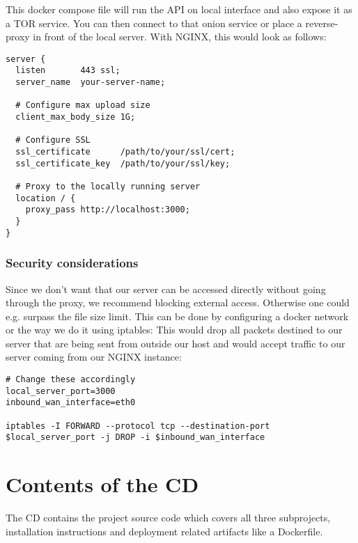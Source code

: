 This docker compose file will run the API on local interface and also expose it as a TOR service. You can then connect to that onion service or place a reverse-proxy in front of the local server. With NGINX, this would look as follows:

\begin{lstlisting}
server {
  listen       443 ssl;
  server_name  your-server-name;

  # Configure max upload size
  client_max_body_size 1G;

  # Configure SSL
  ssl_certificate      /path/to/your/ssl/cert;
  ssl_certificate_key  /path/to/your/ssl/key;
  
  # Proxy to the locally running server
  location / {
    proxy_pass http://localhost:3000;
  }
}
\end{lstlisting}
\subsection{Security considerations}

Since we don't want that our server can be accessed directly without going through the proxy, we recommend blocking external access. Otherwise one could e.g. surpass the file size limit.
This can be done by configuring a docker network or the way we do it using iptables:
This would drop all packets destined to our server that are being sent from outside our host and would accept traffic to our server coming from our NGINX instance:

\begin{lstlisting}
# Change these accordingly
local_server_port=3000
inbound_wan_interface=eth0

iptables -I FORWARD --protocol tcp --destination-port $local_server_port -j DROP -i $inbound_wan_interface
\end{lstlisting}


\chapter{Contents of the CD}
The CD contains the project source code which covers all three subprojects, installation instructions and deployment related artifacts like a Dockerfile.